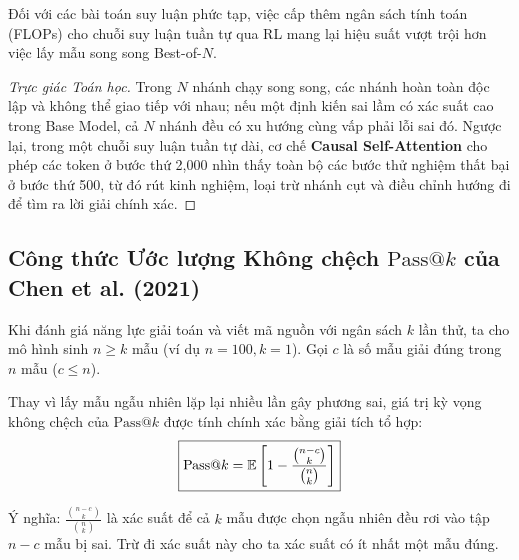 \begin{theorem}
Đối với các bài toán suy luận phức tạp, việc cấp thêm ngân sách tính toán (FLOPs) cho chuỗi suy luận tuần tự qua RL mang lại hiệu suất vượt trội hơn việc lấy mẫu song song Best-of-$N$.
\end{theorem}
\begin{proof}[Trực giác Toán học]
Trong $N$ nhánh chạy song song, các nhánh hoàn toàn độc lập và không thể giao tiếp với nhau; nếu một định kiến sai lầm có xác suất cao trong Base Model, cả $N$ nhánh đều có xu hướng cùng vấp phải lỗi sai đó.
Ngược lại, trong một chuỗi suy luận tuần tự dài, cơ chế \textbf{Causal Self-Attention} cho phép các token ở bước thứ 2,000 nhìn thấy toàn bộ các bước thử nghiệm thất bại ở bước thứ 500, từ đó rút kinh nghiệm, loại trừ nhánh cụt và điều chỉnh hướng đi để tìm ra lời giải chính xác.
\end{proof}

\subsection{Công thức Ước lượng Không chệch $\text{Pass@}k$ của Chen et al. (2021)}
Khi đánh giá năng lực giải toán và viết mã nguồn với ngân sách $k$ lần thử, ta cho mô hình sinh $n \ge k$ mẫu (ví dụ $n = 100, k = 1$). Gọi $c$ là số mẫu giải đúng trong $n$ mẫu ($c \le n$).
\begin{definition}
Thay vì lấy mẫu ngẫu nhiên lặp lại nhiều lần gây phương sai, giá trị kỳ vọng không chệch của $\text{Pass@}k$ được tính chính xác bằng giải tích tổ hợp:
\begin{equation}
    \boxed{\text{Pass@}k = \operatorname{\mathbb{E}} \left[ 1 - \frac{\binom{n - c}{k}}{\binom{n}{k}} \right]}
    \label{eq:pass_at_k}
\end{equation}
\end{definition}
Ý nghĩa: $\frac{\binom{n-c}{k}}{\binom{n}{k}}$ là xác suất để cả $k$ mẫu được chọn ngẫu nhiên đều rơi vào tập $n - c$ mẫu bị sai. Trừ đi xác suất này cho ta xác suất có ít nhất một mẫu đúng.
